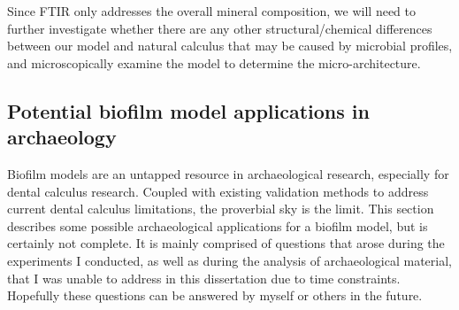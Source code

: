 \documentclass[
  b5paper,
]{book}
\begin{document}
Since FTIR only addresses the overall mineral composition, we will need
to further investigate whether there are any other structural/chemical
differences between our model and natural calculus that may be caused by
microbial profiles, and microscopically examine the model to determine
the micro-architecture.

\subsection{Potential biofilm model applications in
archaeology}\label{bfmodels-in-arch}

Biofilm models are an untapped resource in archaeological research,
especially for dental calculus research. Coupled with existing
validation methods to address current dental calculus limitations, the
proverbial sky is the limit. This section describes some possible
archaeological applications for a biofilm model, but is certainly not
complete. It is mainly comprised of questions that arose during the
experiments I conducted, as well as during the analysis of
archaeological material, that I was unable to address in this
dissertation due to time constraints. Hopefully these questions can be
answered by myself or others in the future.
\end{document}
